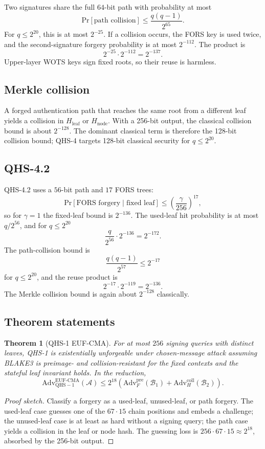 \documentclass[11pt,a4paper]{article}
\newtheorem{theorem}{Theorem}[section]
\theoremstyle{remark}
\newcommand{\Adv}{\mathrm{Adv}}
\newcommand{\Prb}{\mathrm{Pr}}
\newcommand{\EUF}{\mathrm{EUF\text{-}CMA}}
\newcommand{\pre}{\mathrm{pre}}
\newcommand{\coll}{\mathrm{coll}}
\begin{document}
Two signatures share the full \(64\)-bit path with probability at most
\[
\Prb[\text{path collision}]
\le
\frac{q(q-1)}{2^{65}}.
\]
For \(q\le 2^{20}\), this is at most \(2^{-25}\). If a collision occurs, the
FORS key is used twice, and the second-signature forgery probability is at most
\(2^{-112}\). The product is
\[
2^{-25}\cdot 2^{-112}=2^{-137}.
\]
Upper-layer WOTS keys sign fixed roots, so their reuse is harmless.

\subsection{Merkle collision}

A forged authentication path that reaches the same root from a different leaf
yields a collision in \(H_{\text{leaf}}\) or \(H_{\text{node}}\). With a 256-bit
output, the classical collision bound is about \(2^{-128}\). The dominant
classical term is therefore the 128-bit collision bound; QHS-4 targets
128-bit classical security for \(q\le 2^{20}\).

\subsection{QHS-4.2}

QHS-4.2 uses a \(56\)-bit path and \(17\) FORS trees:
\[
\Prb[\text{FORS forgery}\mid \text{fixed leaf}]
\le
\left(\frac{\gamma}{256}\right)^{17},
\]
so for \(\gamma=1\) the fixed-leaf bound is \(2^{-136}\). The used-leaf hit
probability is at most \(q/2^{56}\), and for \(q\le 2^{20}\)
\[
\frac{q}{2^{56}}\cdot 2^{-136}=2^{-172}.
\]
The path-collision bound is
\[
\frac{q(q-1)}{2^{57}}\le 2^{-17}
\]
for \(q\le 2^{20}\), and the reuse product is
\[
2^{-17}\cdot 2^{-119}=2^{-136}.
\]
The Merkle collision bound is again about \(2^{-128}\) classically.

\subsection{Theorem statements}

\begin{theorem}[QHS-1 EUF-CMA]
For at most \(256\) signing queries with distinct leaves, QHS-1 is
existentially unforgeable under chosen-message attack assuming BLAKE3 is
preimage- and collision-resistant for the fixed contexts and the stateful leaf
invariant holds. In the reduction,
\[
\Adv^{\EUF}_{\mathrm{QHS-1}}(\mathcal{A})
\le
2^{18}\left(\Adv^{\pre}_{F}(\mathcal{B}_1)
+\Adv^{\coll}_{H}(\mathcal{B}_2)\right).
\]
\end{theorem}
\begin{proof}[Proof sketch]
Classify a forgery as a used-leaf, unused-leaf, or path forgery. The used-leaf
case guesses one of the \(67\cdot15\) chain positions and embeds a challenge;
the unused-leaf case is at least as hard without a signing query; the path case
yields a collision in the leaf or node hash. The guessing loss is
\(256\cdot67\cdot15\approx2^{18}\), absorbed by the 256-bit output.
\end{proof}
\end{document}
